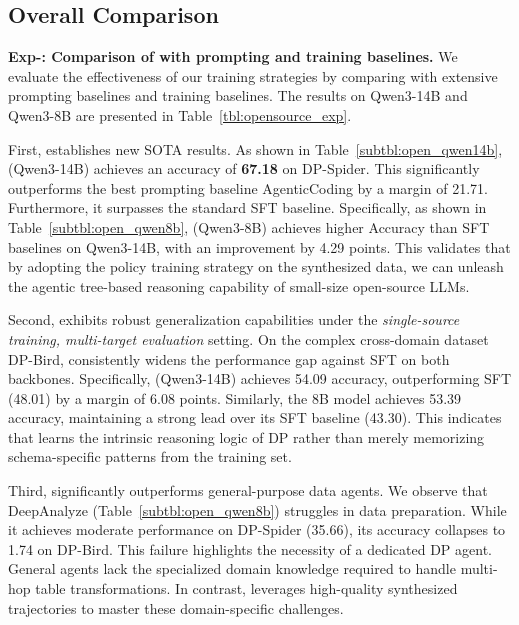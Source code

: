 \subsection{Overall Comparison}
\label{expsec:overall_comparison}


% 

% 
% 
% 


\noindent
\textbf{Exp-\expnum\label{exp:training_comparison}: Comparison of \sys with prompting and training baselines.}
We evaluate the effectiveness of our training strategies by comparing \sys with extensive prompting baselines and training baselines. The results on Qwen3-14B and Qwen3-8B are presented in Table~\ref{tbl:opensource_exp}.

First, \sys establishes new SOTA results. As shown in Table~\ref{subtbl:open_qwen14b}, \sys (Qwen3-14B) achieves an accuracy of \textbf{67.18} on DP-Spider. This significantly outperforms the best prompting baseline AgenticCoding by a margin of 21.71. Furthermore, it surpasses the standard SFT baseline. Specifically, as shown in Table~\ref{subtbl:open_qwen8b}, \sys (Qwen3-8B) achieves higher Accuracy than SFT baselines on Qwen3-14B, with an improvement by 4.29 points. This validates that by adopting the policy training strategy on the synthesized data, we can unleash the agentic tree-based reasoning capability of small-size open-source LLMs.

Second, \sys exhibits robust generalization capabilities under the \textit{single-source training, multi-target evaluation} setting. On the complex cross-domain dataset DP-Bird, \sys consistently widens the performance gap against SFT on both backbones. Specifically, \sys (Qwen3-14B) achieves 54.09 accuracy, outperforming SFT (48.01) by a margin of 6.08 points. Similarly, the 8B model achieves 53.39 accuracy, maintaining a strong lead over its SFT baseline (43.30). This indicates that \sys learns the intrinsic reasoning logic of DP rather than merely memorizing schema-specific patterns from the training set. %

Third, \sys significantly outperforms general-purpose data agents. We observe that DeepAnalyze (Table~\ref{subtbl:open_qwen8b}) struggles in data preparation. While it achieves moderate performance on DP-Spider (35.66), its accuracy collapses to 1.74 on DP-Bird. This failure highlights the necessity of a dedicated DP agent. General agents lack the specialized domain knowledge required to handle multi-hop table transformations. In contrast, \sys leverages high-quality synthesized trajectories to master these domain-specific challenges.

